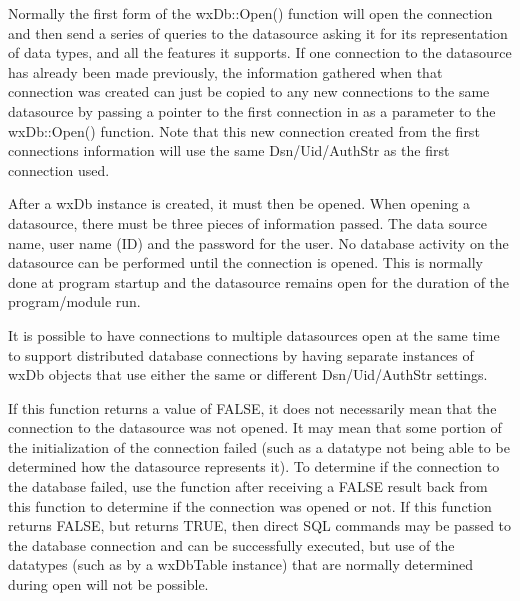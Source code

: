 Normally the first form of the wxDb::Open() function will open the connection 
and then send a series of queries to the datasource asking it for its 
representation of data types, and all the features it supports.  If one 
connection to the datasource has already been made previously, the information 
gathered when that connection was created can just be copied to any new 
connections to the same datasource by passing a pointer to the first 
connection in as a parameter to the wxDb::Open() function.  Note that this 
new connection created from the first connections information will use the 
same Dsn/Uid/AuthStr as the first connection used.




After a wxDb instance is created, it must then be opened.  When opening a 
datasource, there must be three pieces of information passed.  The data 
source name, user name (ID) and the password for the user.  No database 
activity on the datasource can be performed until the connection is opened.  
This is normally done at program startup and the datasource remains 
open for the duration of the program/module run.  

It is possible to have connections to multiple datasources open at the same 
time to support distributed database connections by having separate instances 
of wxDb objects that use either the same or different Dsn/Uid/AuthStr settings.

If this function returns a value of FALSE, it does not necessarily mean that 
the connection to the datasource was not opened.  It may mean that some 
portion of the initialization of the connection failed (such as a datatype not 
being able to be determined how the datasource represents it).  To determine 
if the connection to the database failed, use the  
function after receiving a FALSE result back from this function to determine if 
the connection was opened or not.  If this function returns FALSE, but  
returns TRUE, then direct SQL commands may be passed to the database 
connection and can be successfully executed, but use of the datatypes (such as 
by a wxDbTable instance) that are normally determined during open will not be 
possible.

